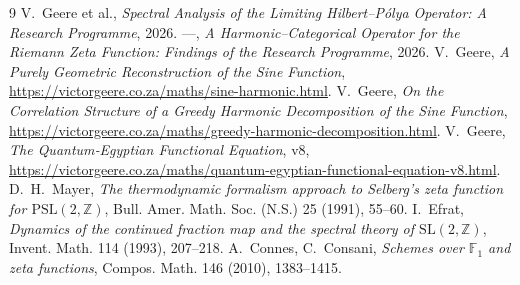 \documentclass[11pt,a4paper]{article}
\theoremstyle{remark}
\begin{document}
\begin{thebibliography}{9}
 V.~Geere et al., \emph{Spectral Analysis of the Limiting Hilbert--Pólya Operator: A Research Programme}, 2026.
 ---, \emph{A Harmonic–Categorical Operator for the Riemann Zeta Function: Findings of the Research Programme}, 2026.
 V.~Geere, \emph{A Purely Geometric Reconstruction of the Sine Function}, \url{https://victorgeere.co.za/maths/sine-harmonic.html}.
 V.~Geere, \emph{On the Correlation Structure of a Greedy Harmonic Decomposition of the Sine Function}, \url{https://victorgeere.co.za/maths/greedy-harmonic-decomposition.html}.
 V.~Geere, \emph{The Quantum‑Egyptian Functional Equation}, v8, \url{https://victorgeere.co.za/maths/quantum-egyptian-functional-equation-v8.html}.
 D.~H.~Mayer, \emph{The thermodynamic formalism approach to Selberg's zeta function for $\mathrm{PSL}(2,\mathbb{Z})$}, Bull. Amer. Math. Soc. (N.S.) 25 (1991), 55--60.
 I.~Efrat, \emph{Dynamics of the continued fraction map and the spectral theory of $\mathrm{SL}(2,\mathbb{Z})$}, Invent. Math. 114 (1993), 207--218.
 A.~Connes, C.~Consani, \emph{Schemes over $\mathbb{F}_1$ and zeta functions}, Compos. Math. 146 (2010), 1383--1415.
\end{thebibliography}
\end{document}
